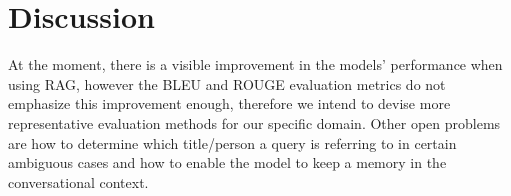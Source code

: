 \documentclass[fleqn,moreauthors,10pt]{ds_report}
\begin{document}
\begin{table}[!htb]
\centering
{}
\caption{Performance comparison against ChatGPT-generated ground truth.}
\label{tab:comparison}
\end{table}



\section*{Discussion}

At the moment, there is a visible improvement in the models' performance when using RAG, however the BLEU and ROUGE evaluation metrics do not emphasize this improvement enough, therefore we intend to devise more representative evaluation methods for our specific domain. Other open problems are how to determine which title/person a query is referring to in certain ambiguous cases and how to enable the model to keep a memory in the conversational context. 





\end{document}
